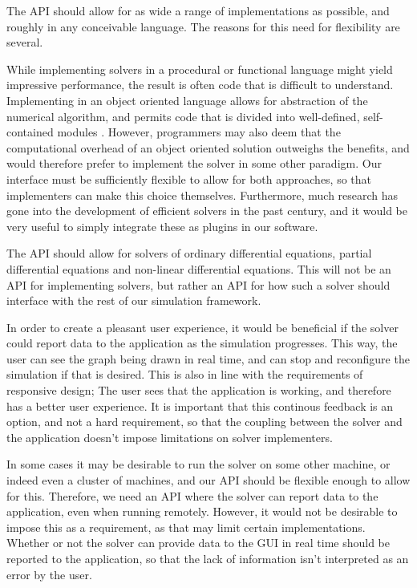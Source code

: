 \documentclass[\rootfolder/main.tex]{subfiles}
\begin{document}
The API should allow for as wide a range of implementations as possible, and roughly in any conceivable language.
The reasons for this need for flexibility are several.

While implementing solvers in a procedural or functional language might yield impressive performance, the result is often code that is difficult to understand.
Implementing in an object oriented language allows for abstraction of the numerical algorithm, and permits code that is divided into well-defined, self-contained modules \cite{kees1999}.
However, programmers may also deem that the computational overhead of an object oriented solution outweighs the benefits, and would therefore prefer to implement the solver in some other paradigm.
Our interface must be sufficiently flexible to allow for both approaches, so that implementers can make this choice themselves.
Furthermore, much research has gone into the development of efficient solvers in the past century, and it would be very useful to simply integrate these as plugins in our software.

The API should allow for solvers of ordinary differential equations, partial differential equations and non-linear differential equations.
This will not be an API for implementing solvers, but rather an API for how such a solver should interface with the rest of our simulation framework.

In order to create a pleasant user experience, it would be beneficial if the solver could report data to the application as the simulation progresses.
This way, the user can see the graph being drawn in real time, and can stop and reconfigure the simulation if that is desired.
This is also in line with the requirements of responsive design; The user sees that the application is working, and therefore has a better user experience.
It is important that this continous feedback is an option, and not a hard requirement, so that the coupling between the solver and the application doesn't impose limitations on solver implementers.

In some cases it may be desirable to run the solver on some other machine, or indeed even a cluster of machines, and our API should be flexible enough to allow for this.
Therefore, we need an API where the solver can report data to the application, even when running remotely.
However, it would not be desirable to impose this as a requirement, as that may limit certain implementations.
Whether or not the solver can provide data to the GUI in real time should be reported to the application, so that the lack of information isn't interpreted as an error by the user.
\end{document}
